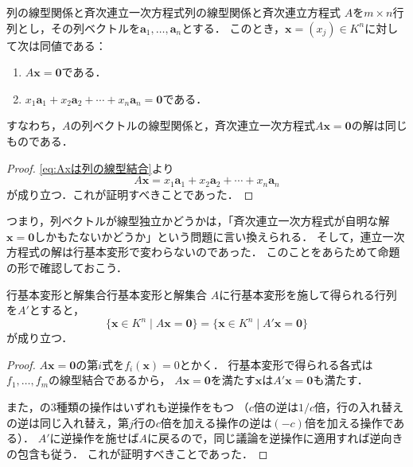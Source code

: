 \begin{prop}{列の線型関係と斉次連立一次方程式}{列の線型関係と斉次連立方程式}
  $A$を$m \times n$行列とし，その列ベクトルを$\bm{a}_1, \dots, \bm{a}_n$とする．
  このとき，$\bm{x} = (x_j) \in K^n$に対して次は同値である：
  \begin{enumerate}[label=(\roman*),leftmargin=3.2em]
    \item $A\bm{x} = \bm{0}$である．
    \item $x_1 \bm{a}_1 + x_2 \bm{a}_2 + \cdots + x_n \bm{a}_n = \bm{0}$である．
  \end{enumerate}
  すなわち，$A$の列ベクトルの線型関係と，斉次連立一次方程式$A\bm{x} = \bm{0}$の解は同じものである．
\end{prop}

\begin{tleftbar}
\begin{proof}
  \eqref{eq:Axは列の線型結合}より
  \[
    A\bm{x} = x_1 \bm{a}_1 + x_2 \bm{a}_2 + \cdots + x_n \bm{a}_n
  \]
  が成り立つ．これが証明すべきことであった．
\end{proof}
\end{tleftbar}

つまり，列ベクトルが線型独立かどうかは，「斉次連立一次方程式が自明な解$\bm{x} = \bm{0}$しかもたないかどうか」という問題に言い換えられる．
そして，連立一次方程式の解は行基本変形で変わらないのであった．
このことをあらためて命題の形で確認しておこう．

\begin{prop}{行基本変形と解集合}{行基本変形と解集合}
  $A$に行基本変形を施して得られる行列を$A'$とすると，
  \[
    \{\bm{x} \in K^n \mid A\bm{x} = \bm{0}\}
    = \{\bm{x} \in K^n \mid A'\bm{x} = \bm{0}\}
  \]
  が成り立つ．
\end{prop}

\begin{tleftbar}
\begin{proof}
  $A\bm{x} = \bm{0}$の第$i$式を$f_i(\bm{x}) = 0$とかく．
  行基本変形で得られる各式は$f_1, \dots, f_m$の線型結合であるから，
  $A\bm{x} = \bm{0}$を満たす$\bm{x}$は$A'\bm{x} = \bm{0}$も満たす．

  また，の$3$種類の操作はいずれも逆操作をもつ
  （$c$倍の逆は$1/c$倍，行の入れ替えの逆は同じ入れ替え，第$j$行の$c$倍を加える操作の逆は$(-c)$倍を加える操作である）．
  $A'$に逆操作を施せば$A$に戻るので，同じ議論を逆操作に適用すれば逆向きの包含も従う．
  これが証明すべきことであった．
\end{proof}
\end{tleftbar}

